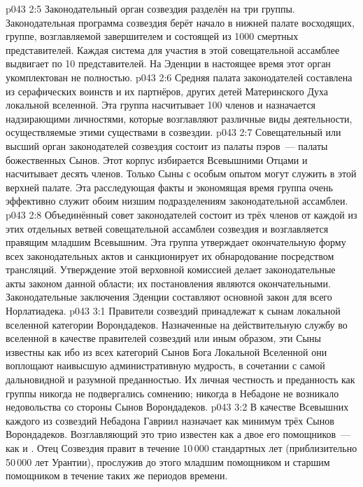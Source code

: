 \vs p043 2:5 \pc Законодательный орган созвездия разделён на три группы. Законодательная программа созвездия берёт начало в нижней палате восходящих, группе, возглавляемой завершителем и состоящей из 1000 смертных представителей. Каждая система для участия в этой совещательной ассамблее выдвигает по 10 представителей. На Эденции в настоящее время этот орган укомплектован не полностью.
\vs p043 2:6 Средняя палата законодателей составлена из серафических воинств и их партнёров, других детей Материнского Духа локальной вселенной. Эта группа насчитывает 100 членов и назначается надзирающими личностями, которые возглавляют различные виды деятельности, осуществляемые этими существами в созвездии.
\vs p043 2:7 Совещательный или высший орган законодателей созвездия состоит из палаты пэров~--- палаты божественных Сынов. Этот корпус избирается Всевышними Отцами и насчитывает десять членов. Только Сыны с особым опытом могут служить в этой верхней палате. Эта расследующая факты и экономящая время группа очень эффективно служит обоим низшим подразделениям законодательной ассамблеи.
\vs p043 2:8 Объединённый совет законодателей состоит из трёх членов от каждой из этих отдельных ветвей совещательной ассамблеи созвездия и возглавляется правящим младшим Всевышним. Эта группа утверждает окончательную форму всех законодательных актов и санкционирует их обнародование посредством трансляций. Утверждение этой верховной комиссией делает законодательные акты законом данной области; их постановления являются окончательными. Законодательные заключения Эденции составляют основной закон для всего Норлатиадека.
\vs p043 3:1 Правители созвездий принадлежат к сынам локальной вселенной категории Ворондадеков. Назначенные на действительную службу во вселенной в качестве правителей созвездий или иным образом, эти Сыны известны как  ибо из всех категорий Сынов Бога Локальной Вселенной они воплощают наивысшую административную мудрость, в сочетании с самой дальновидной и разумной преданностью. Их личная честность и преданность как группы никогда не подвергались сомнению; никогда в Небадоне не возникало недовольства со стороны Сынов Ворондадеков.
\vs p043 3:2 \pc В качестве Всевышних каждого из созвездий Небадона Гавриил назначает как минимум трёх Сынов Ворондадеков. Возглавляющий это трио известен как  а двое его помощников~--- как  и . Отец Созвездия правит в течение 10\,000 стандартных лет (приблизительно 50\,000 лет Урантии), прослужив до этого младшим помощником и старшим помощником в течение таких же периодов времени.
